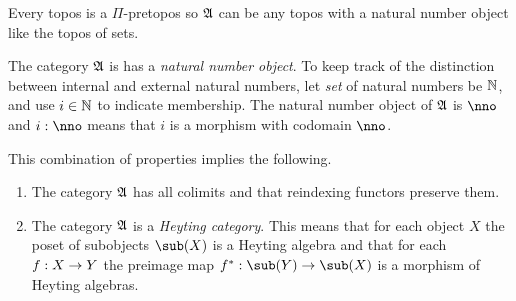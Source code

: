\documentclass[csh.tex]{subfiles}
\begin{document}
\begin{example} Every topos is a $\Pi$-pretopos so $\mathfrak A$ can be any topos with a natural number object like the topos of sets. \end{example}

The category $\mathfrak A$ is has a \emph{natural number object}. To keep track of the distinction between internal and external natural numbers, let \emph{set} of natural numbers be $\mathbb N$, and use $i\in \mathbb N$ to indicate membership. The natural number object of $\mathfrak A$ is $\nno$ and $i\of\nno$ means that $i$ is a morphism with codomain $\nno$.

This combination of properties implies the following.
\begin{enumerate}
\item The category $\mathfrak A$ has all colimits and that reindexing functors preserve them. 
\item The category $\mathfrak A$ is a \emph{Heyting category}. This means that for each object $X$ the poset of subobjects $\sub(X)$ is a Heyting algebra and that for each $f: X\to Y$ the preimage map $f\ri\of\sub(Y)\to\sub(X)$ is a morphism of Heyting algebras. %
\end{enumerate}
\end{document}
